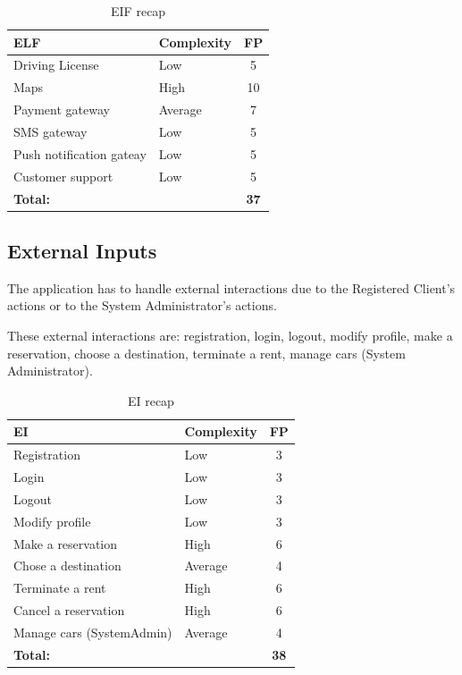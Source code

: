\begin{table}[!h]
\centering
\caption{EIF recap}
\label{etl-recap}
\begin{tabularx}{\linewidth}{XXc}
\hline
\textbf{ELF}                       & \textbf{Complexity} & \textbf{FP} \\ \hline
Driving License           & Low        & 5 \\
Maps                      & High       & 10   \\
Payment gateway           & Average    & 7  \\
SMS gateway               & Low        & 5 \\
Push notification gateay  & Low        & 5 \\
Customer support          & Low        & 5 \\ \hline
\textbf{Total:}           &            & \textbf{37}
\end{tabularx}
\end{table}


\subsection{External Inputs }
The application has to handle external interactions due to the Registered Client’s actions or to the System Administrator’s actions.

These external interactions are: registration, login, logout, modify profile, make a reservation, choose a destination, terminate a rent, manage cars (System Administrator).

\begin{table}[!h]
\centering
\caption{EI recap}
\label{ei-recap}
\begin{tabularx}{\linewidth}{XXc}
\hline
\textbf{EI}                        & \textbf{Complexity} & \textbf{FP} \\ \hline
Registration              & Low        & 3  \\
Login                     & Low        & 3  \\
Logout                    & Low        & 3 \\
Modify profile            & Low        & 3  \\
Make a reservation        & High       & 6 \\
Chose a destination       & Average    & 4 \\
Terminate a rent          & High       & 6 \\
Cancel a reservation      & High       & 6 \\
Manage cars (SystemAdmin) & Average    & 4 \\ \hline
\textbf{Total:}           &            & \textbf{38}
\end{tabularx}
\end{table}

